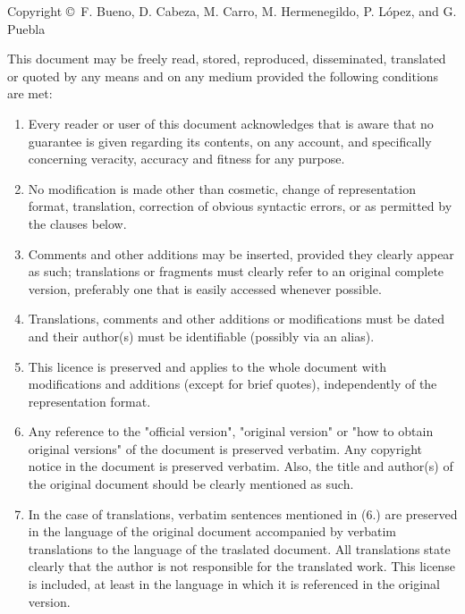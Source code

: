 

\noindent
Copyright \copyright\ F. Bueno, D. Cabeza, M. Carro, M. Hermenegildo,
P. L\'{o}pez, and G. Puebla 

This document may be freely read, stored, reproduced, disseminated, translated 
or quoted by any means and on any medium provided the following conditions 
are met:

\begin{enumerate}

\item Every reader or user of this document acknowledges that is aware that no 
guarantee is given regarding its contents, on any account, and specifically 
concerning veracity, accuracy and fitness for any purpose.

\item No modification is made other than cosmetic, change of
representation format, translation, correction of obvious syntactic
errors, or as permitted by the clauses below.

\item Comments and other additions may be inserted, provided they
clearly appear as such; translations or fragments must clearly refer
to an original complete version, preferably one that is easily
accessed whenever possible.

\item Translations, comments and other additions or modifications must
be dated and their author(s) must be identifiable (possibly via an
alias).

\item This licence is preserved and applies to the whole document with
modifications and additions (except for brief quotes), independently
of the representation format.

\item Any reference to the "official version", "original version" or
"how to obtain original versions" of the document is preserved
verbatim. Any copyright notice in the document is preserved
verbatim. Also, the title and author(s) of the original document
should be clearly mentioned as such.

\item In the case of translations, verbatim sentences mentioned in (6.) are 
preserved in the language of the original document accompanied by verbatim 
translations to the language of the traslated document. All translations 
state clearly that the author is not responsible for the translated work. 
This license is included, at least in the language in which it is referenced 
in the original version.



\end{enumerate}
